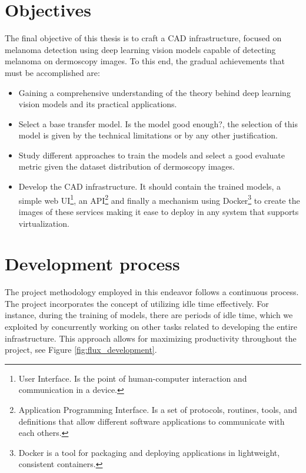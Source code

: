 \newpage

\section{Objectives}

The final objective of this thesis is to craft a CAD infrastructure, focused on
melanoma detection using deep learning vision models capable of detecting
melanoma on dermoscopy images. To this end, the gradual achievements that must
be accomplished are:

\begin{itemize}

  \item Gaining a comprehensive understanding of the theory behind deep
    learning vision models and its practical applications.

   \item Select a base transfer model. Is the model good enough?, the selection
     of this model is given by the technical limitations or by any other
     justification.

  \item Study different approaches to train the models and select a good
    evaluate metric given the dataset distribution of dermoscopy images.

  \item  Develop the CAD infrastructure. It should contain the  trained models,
    a simple web UI\footnote{User Interface. Is the point of human-computer
    interaction and communication in a device.}, an API\footnote{Application
      Programming Interface. Is a set of protocols, routines, tools, and
    definitions that allow different software applications to communicate with
  each others.} and finally a mechanism using Docker\footnote{Docker is a tool
  for packaging and deploying applications in lightweight, consistent
containers.} to create the images of these services making it ease to deploy in
any system that supports virtualization.

\end{itemize}


\section{Development process}

The project methodology employed in this endeavor follows a continuous process.
The project incorporates the concept of utilizing idle time effectively. For
instance, during the training of models, there are periods of idle time, which
we exploited by concurrently working on other tasks related to developing the
entire infrastructure. This approach allows for maximizing productivity
throughout the project, see Figure \ref{fig:flux_development}.

